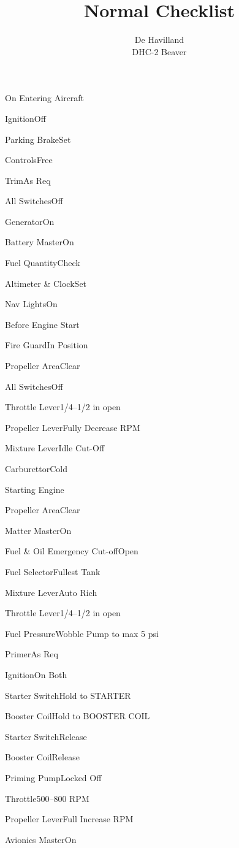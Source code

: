 \documentclass[sim-use]{checklist}
\title{Normal Checklist}
\subtitle{De Havilland \\ DHC-2 Beaver}
\begin{document}
  

\begin{checklist}{On Entering Aircraft}
  \item{Ignition}{Off}
  \item{Parking Brake}{Set}
  \item{Controls}{Free}
  \item{Trim}{As Req}
  \item{All Switches}{Off}
  \item{Generator}{On}
  \item{Battery Master}{On}
  \item{Fuel Quantity}{Check}
  \item{Altimeter \& Clock}{Set}
  \item{Nav Lights}{On}
\end{checklist}
  
\begin{checklist}{Before Engine Start}
  \item{Fire Guard}{In Position}
  \item{Propeller Area}{Clear}
  \item{All Switches}{Off}
  \item{Throttle Lever}{1/4--1/2 in open}
  \item{Propeller Lever}{Fully Decrease RPM}
  \item{Mixture Lever}{Idle Cut-Off}
  \item{Carburettor}{Cold}
\end{checklist}

\begin{checklist}{Starting Engine}
  \item{Propeller Area}{Clear}
  \item{Matter Master}{On}
  \item{Fuel \& Oil Emergency Cut-off}{Open}
  \item{Fuel Selector}{Fullest Tank}
  \item{Mixture Lever}{Auto Rich}
  \item{Throttle Lever}{1/4--1/2 in open}
  \item{Fuel Pressure}{Wobble Pump to max 5 psi}
  \item{Primer}{As Req}
  \item{Ignition}{On Both}
  \item{Starter Switch}{Hold to STARTER}
  \item{Booster Coil}{Hold to BOOSTER COIL}
   {
    \item{Starter Switch}{Release}
    \item{Booster Coil}{Release}
    \item{Priming Pump}{Locked Off}
    \item{Throttle}{500--800 RPM}
  }
   {
    \item{Propeller Lever}{Full Increase RPM}
  }
  \item{Avionics Master}{On}
\end{checklist}
\end{document}
